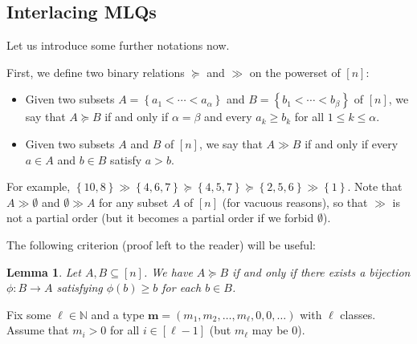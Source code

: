 \documentclass[reqno]{amsart}
\newcommand{\0}{\phantom{c}}
\newcommand{\mm}{\mathbf{m}}
\newcommand{\NN}{\mathbb{N}}
\newcommand{\set}[1]{\left\{ #1 \right\}}
\newcommand{\tup}[1]{\left( #1 \right)}
\newcommand{\ive}[1]{\left[ #1 \right]}
\newcommand{\defn}[1]{{\color{darkred}\emph{#1}}} %
\theoremstyle{plain}
\newtheorem{lemma}[thm]{Lemma}
\theoremstyle{definition}
\numberwithin{equation}{section}
\newcommand{\darij}[1]{\todo[size=\tiny,color=red!30]{#1 \\ \hfill --- Darij}}
\newcommand{\travis}[1]{\todo[size=\tiny,color=blue!30]{#1 \\ \hfill --- Travis}}
\begin{document}
\subsection{Interlacing MLQs}

Let us introduce some further notations now.

First, we define two binary relations $\succeq$ and $\gg$ on the powerset of $\ive{n}$:

\begin{itemize}
\item Given two subsets $A = \set{a_1 < \cdots < a_{\alpha}} $ and $B = \set{b_1 < \cdots < b_{\beta}}$ of $\ive{n}$, we say that \defn{$A\succeq B$} if and only if $\alpha =\beta$ and every $a_k \geq b_k$ for all $1 \leq k \leq \alpha$.

\item Given two subsets $A$ and $B$ of $\ive{n}$, we say that \defn{$A \gg B$} if and only if every $a \in A$ and $b \in B$ satisfy $a > b$.
\end{itemize}

For example, $\set{10,8} \gg \set{4,6,7} \succeq \set{4,5,7} \succeq \set{2,5,6}  \gg \set{1}$.
Note that $A \gg \emptyset$ and $\emptyset \gg A$ for any subset $A$ of $\ive{n}$ (for vacuous reasons), so that $\gg$ is not a partial order (but it becomes a partial order if we forbid $\emptyset$).

The following criterion (proof left to the reader) will be useful:

\begin{lemma}
\label{lem:determinant_form.gale1}
Let $A, B \subseteq \ive{n}$.
We have $A \succeq B$ if and only if there exists a bijection $\phi \colon B \to A$ satisfying $\phi(b) \geq b$ for each $b \in B$.
\end{lemma}

Fix some $\ell \in \NN$ and a type $\mm = \tup{m_1,m_2, \dotsc, m_{\ell}, 0, 0, \ldots}$ with $\ell$ classes.
Assume that $m_i > 0$ for all $i \in \ive{\ell-1}$ (but $m_{\ell}$ may be $0$).
\end{document}
